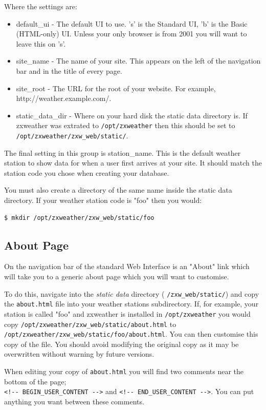 \documentclass[a4paper,10pt,draft]{book}
\begin{document}
Where the settings are:
\begin{itemize}
\item default\_ui - The default UI to use. 's' is the Standard UI, 'b' is the Basic (HTML-only) UI. Unless your only browser is from 2001 you will want to leave this on 's'.
\item site\_name - The name of your site. This appears on the left of the navigation bar and in the title of every page.
\item site\_root - The URL for the root of your website. For example, http://weather.example.com/.
\item static\_data\_dir - Where on your hard disk the static data directory is. If zxweather was extrated to \verb|/opt/zxweather| then this should be set to \verb|/opt/zxweather/zxw_web/static/|.
\end{itemize}

The final setting in this group is station\_name. This is the default weather station to show data for when a user first arrives at your site. It should match the station code you chose when creating your database.

You must also create a directory of the same name inside the static data directory. If your weather station code is "foo" then you would:
\begin{verbatim}
$ mkdir /opt/zxweather/zxw_web/static/foo
\end{verbatim}

\subsection{About Page}
On the navigation bar of the standard Web Interface is an "About" link which will take you to a generic about page which you will want to customise.

To do this, navigate into the \emph{static data} directory ( \verb|/zxw_web/static/|) and copy the \verb|about.html| file into your weather stations subdirectory. If, for example, your station is called "foo" and zxweather is installed in \verb|/opt/zxweather| you would copy \verb|/opt/zxweather/zxw_web/static/about.html| to \\ \verb|/opt/zxweather/zxw_web/static/foo/about.html|. You can then customise this copy of the file. You should avoid modifying the original copy as it may be overwritten without warning by future versions.

When editing your copy of \verb|about.html| you will find two comments near the bottom of the page; \\
\verb|<!-- BEGIN_USER_CONTENT -->| and \verb|<!-- END_USER_CONTENT -->|. You can put anything you want between these comments.
\end{document}
